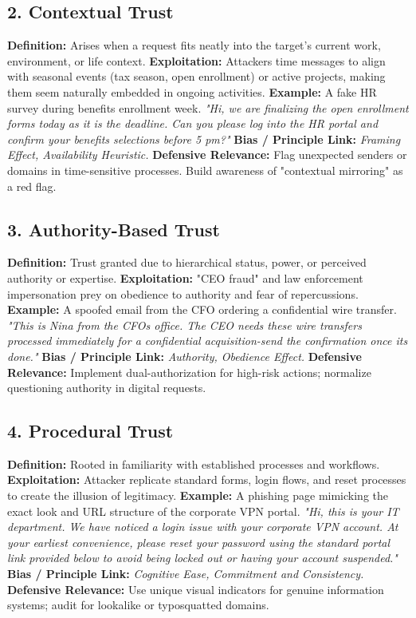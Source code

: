 {\subsection{2. Contextual Trust}
\textbf{Definition:} Arises when a request fits neatly into the target's current work, environment, or life context.
\textbf{Exploitation:} Attackers time messages to align with seasonal events (tax season, open enrollment) or active projects, making them seem naturally embedded in ongoing activities.
\textbf{Example:} A fake HR survey during benefits enrollment week.
\textit{"Hi, we are finalizing the open enrollment forms today as it is the deadline. Can you please log into the HR portal and confirm your benefits selections before 5 pm?"}
\textbf{Bias / Principle Link:} \textit{Framing Effect, Availability Heuristic.}
\textbf{Defensive Relevance:} Flag unexpected senders or domains in time-sensitive processes. Build awareness of "contextual mirroring" as a red flag.

\subsection{3. Authority-Based Trust}
\textbf{Definition:} Trust granted due to hierarchical status, power, or perceived authority or expertise.
\textbf{Exploitation:} "CEO fraud" and law enforcement impersonation prey on obedience to authority and fear of repercussions.
\textbf{Example:} A spoofed email from the CFO ordering a confidential wire transfer.
\textit{"This is Nina from the CFOs office. The CEO needs these wire transfers processed immediately for a confidential acquisition-send the confirmation once its done."}
\textbf{Bias / Principle Link:} \textit{Authority, Obedience Effect.}
\textbf{Defensive Relevance:} Implement dual-authorization for high-risk actions; normalize questioning authority in digital requests.

\subsection{4. Procedural Trust}
\textbf{Definition:} Rooted in familiarity with established processes and workflows.
\textbf{Exploitation:} Attacker replicate standard forms, login flows, and reset processes to create the illusion of legitimacy.
\textbf{Example:} A phishing page mimicking the exact look and URL structure of the corporate VPN portal.
\textit{"Hi, this is your IT department. We have noticed a login issue with your corporate VPN account. At your earliest convenience, please reset your password using the standard portal link provided below to avoid being locked out or having your account suspended."}
\textbf{Bias / Principle Link:} \textit{Cognitive Ease, Commitment and Consistency.}
\textbf{Defensive Relevance:} Use unique visual indicators for genuine information systems; audit for lookalike or typosquatted domains.

}
